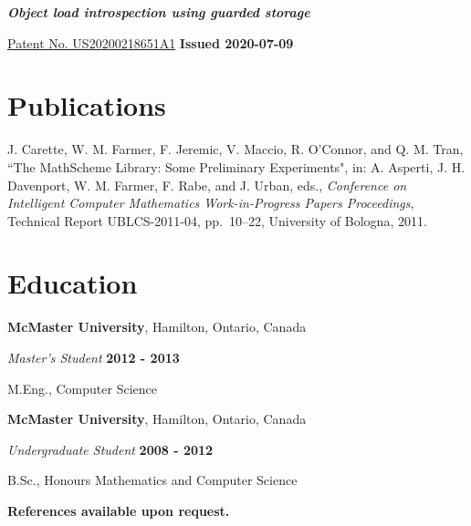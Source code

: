 \documentclass[margin,line]{res}
\begin{document}
\begin{resume}
\begin{list}{}{\leftmargin=0cm}
\item {\em \bf Object load introspection using guarded storage}

\href{https://patents.google.com/patent/US20200218651A1}{Patent No. US20200218651A1} \hfill {\bf Issued 2020-07-09}

\end{list}

\section{\sc Publications}

J. Carette, W. M. Farmer, F. Jeremic, V. Maccio, R. O'Connor, and Q. M. Tran, ``The MathScheme Library: Some
Preliminary Experiments", in: A. Asperti, J. H. Davenport, W. M. Farmer, F. Rabe, and J. Urban, eds.,
\emph{Conference on Intelligent Computer Mathematics Work-in-Progress Papers Proceedings}, Technical Report
UBLCS-2011-04, pp.~10--22, University of Bologna, 2011.

\section{\sc Education}

{\bf McMaster University}, Hamilton, Ontario, Canada

\vspace{-.3cm}

{\em Master's Student} \hfill {\bf 2012 - 2013}

\vspace{-.4cm}

M.Eng., Computer Science

{\bf McMaster University}, Hamilton, Ontario, Canada

\vspace{-.3cm}

{\em Undergraduate Student} \hfill {\bf 2008 - 2012}

\vspace{-.4cm}

B.Sc., Honours Mathematics and Computer Science

\begin{center}
\textbf{References available upon request.}
\end{center}

\end{resume}
\end{document}
